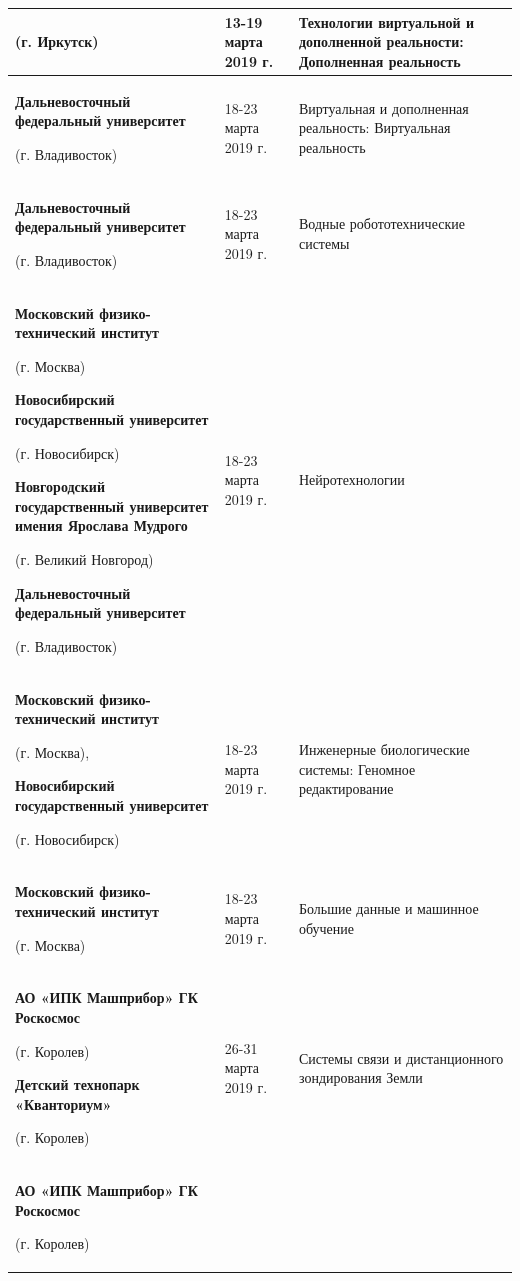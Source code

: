 \begin{center}
\begin{longtable}{|p{7.5cm}|p{2.5cm}|p{5cm}|}
        (г. Иркутск) & 13-19 марта 2019 г. & Технологии виртуальной и дополненной реальности: Дополненная реальность\\
        \hline
        \textbf{Дальневосточный федеральный университет}

        (г. Владивосток) & 18-23 марта 2019 г. & Виртуальная и дополненная реальность: Виртуальная реальность \\
        \hline
        \textbf{Дальневосточный федеральный университет} 

        (г. Владивосток) & 18-23 марта 2019 г. & Водные робототехнические системы \\
        \hline
        \textbf{Московский физико-технический институт}

        (г. Москва)

        \textbf{Новосибирский государственный университет}

        (г. Новосибирск) 

        \textbf{Новгородский государственный университет имения Ярослава Мудрого}

        (г. Великий Новгород)

        \textbf{Дальневосточный федеральный университет}

        (г. Владивосток) & 18-23 марта 2019 г. & Нейротехнологии \\
        \hline 
        \textbf{Московский физико-технический институт}

        (г. Москва),

        \textbf{Новосибирский государственный университет}

        (г. Новосибирск) & 18-23 марта 2019 г. & Инженерные биологические системы: Геномное редактирование \\
        \hline
        \textbf{Московский физико-технический институт}

        (г. Москва) & 18-23 марта 2019 г. & Большие данные и машинное обучение \\
        \hline
        \textbf{АО «ИПК Машприбор» ГК Роскосмос} 

        (г. Королев)

        \textbf{Детский технопарк «Кванториум»}

        (г. Королев) & 26-31 марта 2019 г. & Системы связи и дистанционного зондирования Земли \\
        \hline
        \textbf{АО «ИПК Машприбор» ГК Роскосмос}

        (г. Королев)


\end{longtable}
\end{center}
